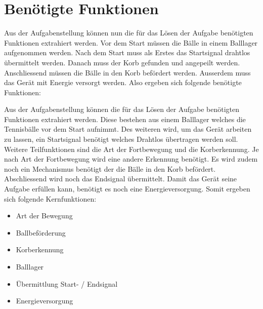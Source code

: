 \section{Benötigte Funktionen}
Aus der Aufgabenstellung können nun die für das Lösen der Aufgabe benötigten 
Funktionen extrahiert werden. Vor dem Start müssen die Bälle in einem Balllager 
aufgenommen werden. Nach dem Start muss als Erstes das Startsignal drahtlos 
übermittelt werden. Danach muss der Korb gefunden und angepeilt werden. 
Anschliessend müssen die Bälle in den Korb befördert werden. Ausserdem muss 
das Gerät mit Energie versorgt werden. Also ergeben sich folgende benötigte 
Funktionen: 

Aus der Aufgabenstellung können die für das Lösen der Aufgabe benötigten Funktionen extrahiert werden.
Diese bestehen aus einem Balllager welches die Tennisbälle vor dem Start aufnimmt. Des weiteren wird,
um das Gerät arbeiten zu lassen, ein Startsignal benötigt welches Drahtlos übertragen werden soll. Weitere
Teilfunktionen sind die Art der Fortbewegung und die Korberkennung. Je nach Art der Fortbewegung wird eine 
andere Erkennung benötigt. Es wird zudem noch ein Mechanismus benötigt der die Bälle in den Korb befördert.
Abschliessend wird noch das Endsignal übermittelt.
Damit das Gerät seine Aufgabe erfüllen kann, benötigt es noch eine Energieversorgung.
Somit ergeben sich folgende Kernfunktionen:

\begin{itemize}
    \item Art der Bewegung
    \item Ballbeförderung
    \item Korberkennung
    \item Balllager
    \item Übermittlung Start- / Endsignal
    \item Energieversorgung
\end{itemize}

